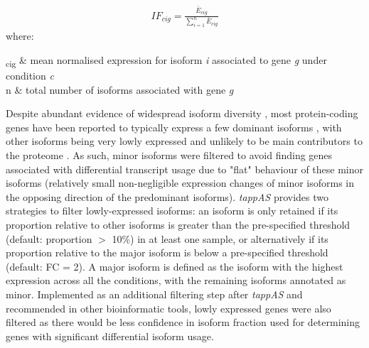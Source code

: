 \begin{myequation}[!h]
	\label{eqn:tappas_IF}
	\begin{align}
		IF_{cig} = \frac{\bar{E}_{cig}}{\sum_{i=1}^{n}\bar{E}_{cig}}
	\end{align}
	where:
	\begin{conditions*}
		\hspace{3mm}\textsubscript{cig} & mean normalised expression for isoform \textit{i} associated to gene \textit{g} under condition \textit{c}\\
		\hspace{3mm}n  & total number of isoforms associated with gene \textit{g}
	\end{conditions*}
\end{myequation}

Despite abundant evidence of widespread isoform diversity \cite{Wang2008}, most protein-coding genes have been reported to typically express a few dominant isoforms \cite{Gonzalez-Porta2013, Ezkurdia2015}, with other isoforms being very lowly expressed and unlikely to be main contributors to the proteome \cite{Gonzalez-Porta2013}. As such, minor isoforms were filtered to avoid finding genes associated with differential transcript usage due to "flat" behaviour of these minor isoforms \cite{DeLaFuente2020} (relatively small non-negligible expression changes of minor isoforms in the opposing direction of the predominant isoforms). \textit{tappAS} provides two strategies to filter lowly-expressed isoforms: an isoform is only retained if its proportion relative to other isoforms is greater than the pre-specified threshold (default: proportion $>$ 10\%) in at least one sample, or alternatively if its proportion relative to the major isoform is below a pre-specified threshold (default: FC = 2). A major isoform is defined as the isoform with the highest expression across all the conditions, with the remaining isoforms annotated as minor. Implemented as an additional filtering step after \textit{tappAS} and recommended in other bioinformatic tools\cite{Vitting-Seerup2017}, lowly expressed genes were also filtered as there would be less confidence in isoform fraction used for determining genes with significant differential isoform usage.   